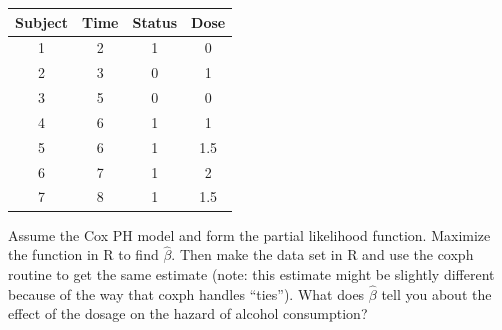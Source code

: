\documentclass[12pt]{article}
\begin{document}
\begin{center}
\begin{tabular}{ c c c c } \hline
Subject & Time & Status & Dose \\ \hline
1 & 2 & 1 &  0\\
 2 & 3 & 0 &  1\\
3 & 5 & 0  & 0\\
4  & 6 & 1  & 1\\
5  & 6 & 1  & 1.5\\
6  & 7 & 1  & 2\\
7  & 8 & 1  & 1.5\\
\end{tabular}
\end{center}
Assume the Cox PH model and form the partial likelihood function. Maximize the function in R to find $\hat{\beta}$. Then make the data set in R and use the coxph routine to get the same estimate (note: this estimate might be slightly different because of the way that coxph handles ``ties''). What does $\hat{\beta}$ tell you about the effect of the dosage on the hazard of alcohol consumption? 
\end{document}
